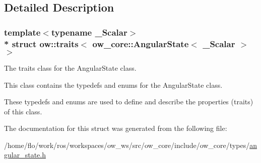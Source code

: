 \subsection{Detailed Description}
\subsubsection*{template$<$typename \+\_\+\+Scalar$>$\\*
struct ow\+::traits$<$ ow\+\_\+core\+::\+Angular\+State$<$ \+\_\+\+Scalar $>$ $>$}

The traits class for the Angular\+State class. 

This class contains the typedefs and enums for the Angular\+State class.

These typedefs and enums are used to define and describe the properties (traits) of this class. 

The documentation for this struct was generated from the following file\+:\begin{DoxyCompactItemize}
\item 
/home/flo/work/ros/workspaces/ow\+\_\+ws/src/ow\+\_\+core/include/ow\+\_\+core/types/\hyperlink{angular__state_8h}{angular\+\_\+state.\+h}\end{DoxyCompactItemize}
